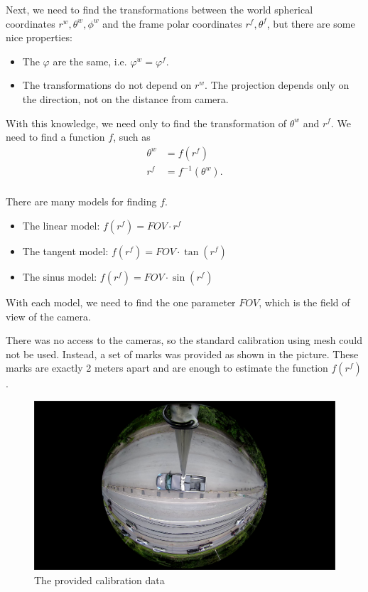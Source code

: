 \documentclass[a4paper,12pt,titlepage, twoside]{article}
\numberwithin{figure}{section}
\begin{document}
Next, we need to find the transformations between the world spherical coordinates $r^w, \theta^w, \phi^w$ and the frame polar coordinates $r^f, \theta^f$, but there are some nice properties:

\begin{itemize}
\item The $\varphi$ are the same, i.e. $\varphi^w = \varphi^f$.
\item The transformations do not depend on $r^w$. The projection depends only on the direction, not on the distance from camera.
\end{itemize}

With this knowledge, we need only to find the transformation of $\theta^w$ and $r^f$. We need to find a function $f$, such as 
\begin{equation}
\begin{aligned}
\theta^w &= f(r^f) \\
r^f &= f^{-1}(\theta^w). \\
\end{aligned}
\end{equation}

There are many models for finding $f$. 

\begin{itemize}
\item The linear model: $f(r^f) = FOV \cdot r^f$
\item The tangent model: $f(r^f) = FOV \cdot \tan(r^f)$
\item The sinus model: $f(r^f) = FOV \cdot \sin(r^f)$
\end{itemize}

With each model, we need to find the one parameter $FOV$, which is the field of view of the camera.

There was no access to the cameras, so the standard calibration using mesh could not be used. Instead, a set of marks was provided as shown in the picture. These marks are exactly 2 meters apart and are enough to estimate the function $f(r^f)$.

\begin{figure}[h!]
\centering
\includegraphics[width=1\linewidth]{fig/calibration.png}
\caption{The provided calibration data}
\label{fig:calibration}
\end{figure}
\end{document}
